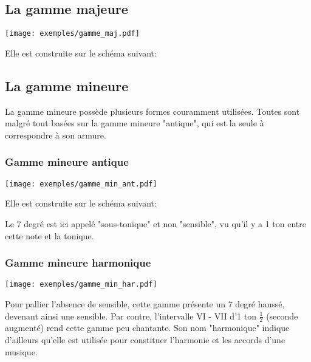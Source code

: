 \documentclass[11pt,a4paper]{scrreprt}
\begin{document}
\subsection{La gamme majeure}
\begin{center}
  \texttt{[image: exemples/gamme\_maj.pdf]}
\end{center}
Elle est construite sur le schéma suivant: 
\begin{center}
\end{center}


\subsection{La gamme mineure}
La gamme mineure possède plusieurs formes couramment utilisées. Toutes sont malgré tout basées sur la gamme mineure "antique", qui est la seule à correspondre à son armure.

\subsubsection{Gamme mineure antique\label{min_ant}}
\begin{center}
   \texttt{[image: exemples/gamme\_min\_ant.pdf]}
\end{center}

Elle est construite sur le schéma suivant: 
\begin{center}
\end{center}
Le 7\ieme{} degré est ici appelé "sous-tonique" et non "sensible", vu qu'il y a 1 ton entre cette note et la tonique.

\subsubsection{Gamme mineure harmonique}
\begin{center}
   \texttt{[image: exemples/gamme\_min\_har.pdf]}
\end{center}

Pour pallier l'absence de sensible, cette gamme présente un 7\ieme{} degré haussé, devenant ainsi une sensible. Par contre, l'intervalle VI - VII d'1 ton $\frac1 2$ (seconde augmenté) rend cette gamme peu chantante. Son nom "harmonique" indique d'ailleurs qu'elle est utilisée pour constituer l'harmonie et les accords d'une musique.
\end{document}
